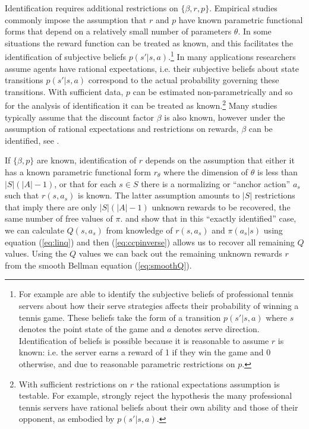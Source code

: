 Identification requires additional restrictions on $\{\beta,r,p\}$. 
Empirical studies commonly impose the assumption that $r$ and $p$ have known parametric functional forms that depend on a relatively small number of parameters $\theta$. In some situations the reward function can be treated as
known, and this facilitates the identification of subjective beliefs $p(s'|s,a)$.\footnote{\footnotesize 
For example \citet{tennis:2025} are able to identify the subjective beliefs of professional tennis servers about how their serve
strategies affects their probability of winning a tennis game. These beliefs take the form of a transition $p(s'|s,a)$ where $s$ denotes
the point state of the game and $a$ denotes serve direction. Identification of beliefs is possible  because it is reasonable to assume
$r$ is known: i.e. the server earns a reward of 1 if they win the game and 0 otherwise, and due to reasonable parametric restrictions
on $p$.}
In many applications researchers assume agents have rational expectations, 
i.e. their subjective beliefs about state transitions $p(s'|s,a)$ correspond to the actual probability governing
these transitions. With sufficient data, $p$ can be estimated non-parametrically and so for the analysis of identification
it can be treated as known.\footnote{\footnotesize With sufficient restrictions on $r$ the rational expectations
 assumption is testable. For example, \citet{tennis:2025} strongly reject the hypothesis the many professional tennis servers have rational beliefs about their
own ability and those of their opponent, as embodied by $p(s'|s,a)$.}
Many studies typically assume that the discount factor $\beta$ is also known, however under the assumption of 
rational expectations and restrictions on rewards, $\beta$ can be identified, see \citet{abbringdaljord:2020}.

If $\{\beta,p\}$ are known, identification of $r$ depends on the assumption that either it has a known parametric
functional form $r_\theta$ where the dimension of $\theta$ 
is less than $|S|(|A|-1)$, or that for each $s \in S$ there is
a normalizing or ``anchor action'' $a_s$ such that  $r(s,a_s)$ is known. The latter assumption amounts to $|S|$ restrictions
that imply there are only $|S|(|A|-1)$ unknown rewards to be recovered, the same number of free values of $\pi$. 
\citet{hotzmiller:1993} and \citet{kang:2025} show that in this ``exactly identified'' case,
we can calculate $Q(s,a_s)$ from knowledge of $r(s,a_s)$ and $\pi(a_s|s)$ using equation (\ref{eq:linq}) 
and then (\ref{eq:ccpinverse}) allows us to recover all remaining $Q$ values. 
Using the $Q$ values we can back out the remaining unknown rewards $r$ from the smooth Bellman equation (\ref{eq:smoothQ}).

